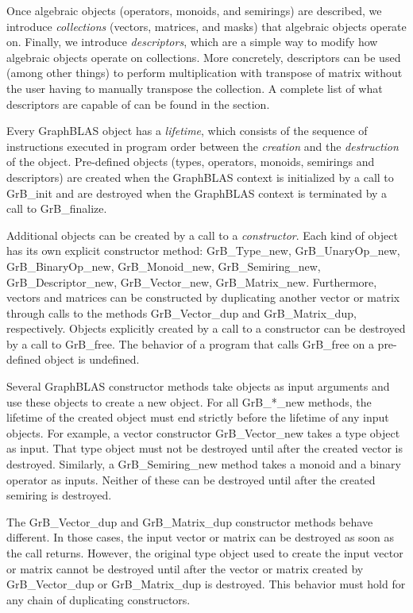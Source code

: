 Once algebraic objects (operators, monoids, and semirings) are described,
we introduce \emph{collections} (vectors, matrices, and masks) that
algebraic objects operate on. Finally, we introduce \emph{descriptors},
which are a simple way to modify how algebraic objects operate on
collections. More concretely, descriptors can be used (among other
things) to perform multiplication with transpose of matrix without the
user having to manually transpose the collection. A complete list of
what descriptors are capable of can be found in the section.

Every GraphBLAS object has a \emph{lifetime}, which consists of
the sequence of instructions executed in program order between the
\emph{creation} and the \emph{destruction} of the object.  Pre-defined
objects (types, operators, monoids, semirings and descriptors) are created
when the GraphBLAS context is initialized by a call to {\sf GrB\_init}
and are destroyed when the GraphBLAS context is terminated by a call to
{\sf GrB\_finalize}.

Additional objects can be created by a call to a \emph{constructor}.
Each kind of object has its own explicit constructor method: {\sf GrB\_Type\_new},
{\sf GrB\_UnaryOp\_new}, {\sf GrB\_BinaryOp\_new}, {\sf GrB\_Monoid\_new},
{\sf GrB\_Semiring\_new}, {\sf GrB\_Descriptor\_new}, {\sf GrB\_Vector\_new},
{\sf GrB\_Matrix\_new}. Furthermore, vectors and matrices can be
constructed by duplicating another vector or matrix through calls 
to the methods {\sf GrB\_Vector\_dup} and {\sf GrB\_Matrix\_dup}, respectively.
Objects explicitly created by a call to a constructor can be destroyed
by a call to {\sf GrB\_free}. The behavior of a program
that calls {\sf GrB\_free} on a pre-defined object is undefined.

Several GraphBLAS constructor methods take objects as input arguments
and use these objects to create a new object. For all {\sf GrB\_*\_new}
methods, the lifetime of the created object must end strictly before
the lifetime of any input objects. For example, a vector constructor
{\sf GrB\_Vector\_new} takes a type object as input. That type
object must not be destroyed until after the created vector is destroyed.
Similarly, a {\sf GrB\_Semiring\_new} method takes a monoid and
a binary operator as inputs. Neither of these can be destroyed until
after the created semiring is destroyed.

The {\sf GrB\_Vector\_dup} and {\sf GrB\_Matrix\_dup} constructor
methods behave different. In those cases, the input vector or matrix can
be destroyed as soon as the call returns. However, the original type
object used to create the input vector or matrix cannot be destroyed
until after the vector or matrix created by {\sf GrB\_Vector\_dup} or
{\sf GrB\_Matrix\_dup} is destroyed.  This behavior must hold for any
chain of duplicating constructors.


